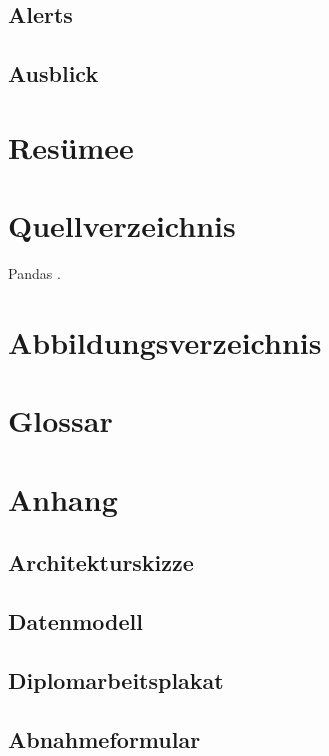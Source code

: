 \documentclass{report}
\begin{document}
\section{Alerts}
\section{Ausblick}

\chapter{Resümee}


\chapter*{Quellverzeichnis}
Pandas \citep{pandas_docs}.

\chapter*{Abbildungsverzeichnis}

\chapter*{Glossar}

\chapter*{Anhang}
\section{Architekturskizze}
\section{Datenmodell}
\section{Diplomarbeitsplakat}
\section{Abnahmeformular}
\end{document}
